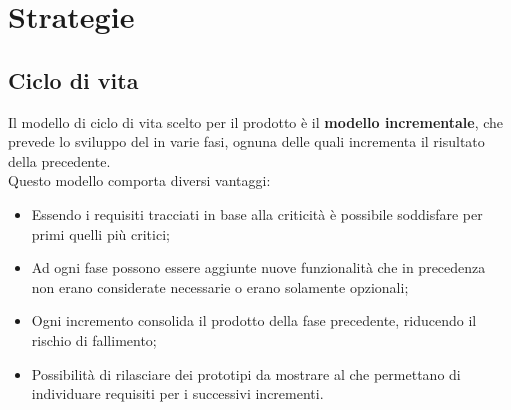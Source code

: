\section{Strategie}\label{strategie}
\subsection{Ciclo di vita}\label{cicloVita}
Il modello di ciclo di vita scelto per il prodotto è il \textbf{modello incrementale}, che prevede lo sviluppo del  in varie fasi, ognuna delle quali incrementa il risultato della precedente. \\
Questo modello comporta diversi vantaggi:
\begin{itemize}
\item Essendo i requisiti tracciati in base alla criticità è possibile soddisfare per primi quelli più critici;
\item Ad ogni fase possono essere aggiunte nuove funzionalità che in precedenza non erano considerate necessarie o erano solamente opzionali;
\item Ogni incremento consolida il prodotto della fase precedente, riducendo il rischio di fallimento;
\item Possibilità di rilasciare dei prototipi da mostrare al  che permettano di individuare requisiti per i successivi incrementi.
\end{itemize}

